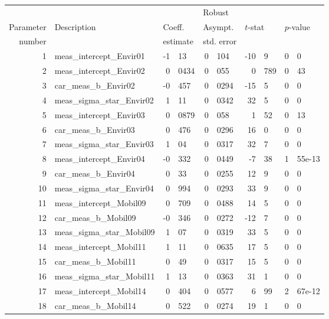 \documentclass[12pt,a4paper]{article}
\begin{document}
\begin{table}[htb]
    \footnotesize
  \begin{center}
\begin{tabular}{rlr@{.}lr@{.}lr@{.}lr@{.}l}
  &              &   \multicolumn{2}{l}{}         & \multicolumn{2}{l}{Robust}  &  \multicolumn{4}{l}{}  \\
  Parameter & Description & \multicolumn{2}{l}{Coeff.} & \multicolumn{2}{l}{Asympt.} & \multicolumn{2}{l}{$t$-stat} & \multicolumn{2}{l}{$p$-value} \\
  number    &             & \multicolumn{2}{l}{estimate} & \multicolumn{2}{l}{std. error} & \multicolumn{2}{l}{} & \multicolumn{2}{l}{} \\
  \hline
1 & meas\_intercept\_Envir01 & -1&13 & 0&104 & -10&9 & 0&0 \\ 
2 & meas\_intercept\_Envir02 & 0&0434 & 0&055 & 0&789 & 0&43 \\ 
3 & car\_meas\_b\_Envir02 & -0&457 & 0&0294 & -15&5 & 0&0 \\ 
4 & meas\_sigma\_star\_Envir02 & 1&11 & 0&0342 & 32&5 & 0&0 \\ 
5 & meas\_intercept\_Envir03 & 0&0879 & 0&058 & 1&52 & 0&13 \\ 
6 & car\_meas\_b\_Envir03 & 0&476 & 0&0296 & 16&0 & 0&0 \\ 
7 & meas\_sigma\_star\_Envir03 & 1&04 & 0&0317 & 32&7 & 0&0 \\ 
8 & meas\_intercept\_Envir04 & -0&332 & 0&0449 & -7&38 & 1&55e-13 \\ 
9 & car\_meas\_b\_Envir04 & 0&33 & 0&0255 & 12&9 & 0&0 \\ 
10 & meas\_sigma\_star\_Envir04 & 0&994 & 0&0293 & 33&9 & 0&0 \\ 
11 & meas\_intercept\_Mobil09 & 0&709 & 0&0488 & 14&5 & 0&0 \\ 
12 & car\_meas\_b\_Mobil09 & -0&346 & 0&0272 & -12&7 & 0&0 \\ 
13 & meas\_sigma\_star\_Mobil09 & 1&07 & 0&0319 & 33&5 & 0&0 \\ 
14 & meas\_intercept\_Mobil11 & 1&11 & 0&0635 & 17&5 & 0&0 \\ 
15 & car\_meas\_b\_Mobil11 & 0&49 & 0&0317 & 15&5 & 0&0 \\ 
16 & meas\_sigma\_star\_Mobil11 & 1&13 & 0&0363 & 31&1 & 0&0 \\ 
17 & meas\_intercept\_Mobil14 & 0&404 & 0&0577 & 6&99 & 2&67e-12 \\ 
18 & car\_meas\_b\_Mobil14 & 0&522 & 0&0274 & 19&1 & 0&0 \\ 

\end{tabular}
\end{center}
\end{table}
\end{document}

